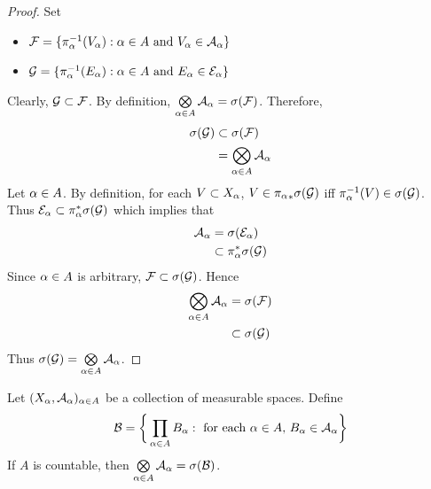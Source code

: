 \documentclass{book}
\begin{document}
 	\begin{proof}
 		Set 
 		\begin{itemize}
 			\item $\mathcal{F} = \{\pi_{\alpha}^{-1}(V_{\alpha}): \alpha \in A \text{ and } V_{\alpha} \in \mathcal{A}_{\alpha}\}$ 
 			\item $\mathcal{G} = \{\pi_{\alpha}^{-1}(E_{\alpha}): \alpha \in A \text{ and } E_{\alpha} \in \mathcal{E}_{\alpha}\}$
 		\end{itemize}
 		Clearly, $\mathcal{G} \subset \mathcal{F}$. By definition, $\bigotimes\limits_{\alpha \in A} \mathcal{A}_{\alpha} = \sigma(\mathcal{F})$. Therefore, 
 		\begin{align*}
 			\sigma(\mathcal{G}) 
 			& \subset \sigma(\mathcal{F}) \\
 			& = \bigotimes\limits_{\alpha \in A} \mathcal{A}_{\alpha}
 		\end{align*}
 		Let $\alpha \in A$. By definition, for each $V \subset X_{\alpha}$, $V \in {\pi_{\alpha}}_* \sigma(\mathcal{G})$ iff $\pi_{\alpha}^{-1}(V) \in \sigma(\mathcal{G})$. Thus $\mathcal{E}_{\alpha} \subset \pi_{\alpha}^* \sigma(\mathcal{G})$ which implies that 
 		\begin{align*}
 			\mathcal{A}_{\alpha} 
 			& = \sigma(\mathcal{E}_{\alpha}) \\
 			& \subset \pi_{\alpha}^* \sigma(\mathcal{G})
 		\end{align*}
 		Since $\alpha \in A$ is arbitrary, $\mathcal{F} \subset \sigma(\mathcal{G})$. Hence 
 		\begin{align*}
 			\bigotimes\limits_{\alpha \in A} \mathcal{A}_{\alpha} 
 			& = \sigma(\mathcal{F}) \\
 			& \subset \sigma(\mathcal{G})
 		\end{align*}
 		Thus $\sigma(\mathcal{G}) = \bigotimes\limits_{\alpha \in A} \mathcal{A}_{\alpha}$.
 	\end{proof}
 
 	\begin{ex} 
 		Let $(X_{\alpha}, \mathcal{A}_{\alpha})_{\alpha \in A}$ be a collection of measurable spaces. Define $$\mathcal{B} = \bigg \{\prod_{\alpha \in A}B_{\alpha}: \text{ for each $\alpha \in A$, } B_{\alpha} \in \mathcal{A}_{\alpha} \bigg\}$$
 		If $A$ is countable, then $\bigotimes\limits_{\alpha \in A} \mathcal{A}_{\alpha} = \sigma(\mathcal{B})$. 
 	\end{ex}
 	
\end{document}
